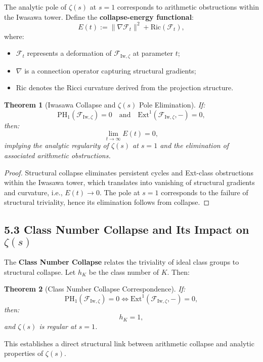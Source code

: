 \documentclass[11pt]{article}
\newtheorem{theorem}{Theorem}[section]
\begin{document}
The analytic pole of $\zeta(s)$ at $s = 1$ corresponds to arithmetic obstructions within the Iwasawa tower. Define the \textbf{collapse-energy functional}:
\[
E(t) := \| \nabla \mathcal{F}_t \|^2 + \mathrm{Ric}(\mathcal{F}_t),
\]
where:
\begin{itemize}
    \item $\mathcal{F}_t$ represents a deformation of $\mathcal{F}_{\mathrm{Iw}, \zeta}$ at parameter $t$;
    \item $\nabla$ is a connection operator capturing structural gradients;
    \item $\mathrm{Ric}$ denotes the Ricci curvature derived from the projection structure.
\end{itemize}

\begin{theorem}[Iwasawa Collapse and $\zeta(s)$ Pole Elimination]
If:
\[
\mathrm{PH}_1(\mathcal{F}_{\mathrm{Iw}, \zeta}) = 0 \quad \text{and} \quad \mathrm{Ext}^1(\mathcal{F}_{\mathrm{Iw}, \zeta}, -) = 0,
\]
then:
\[
\lim_{t \to \infty} E(t) = 0,
\]
implying the analytic regularity of $\zeta(s)$ at $s = 1$ and the elimination of associated arithmetic obstructions.
\end{theorem}

\begin{proof}
Structural collapse eliminates persistent cycles and Ext-class obstructions within the Iwasawa tower, which translates into vanishing of structural gradients and curvature, i.e., $E(t) \to 0$. The pole at $s = 1$ corresponds to the failure of structural triviality, hence its elimination follows from collapse.
\end{proof}

\subsection*{5.3 Class Number Collapse and Its Impact on $\zeta(s)$}

The \textbf{Class Number Collapse} relates the triviality of ideal class groups to structural collapse. Let $h_K$ be the class number of $K$. Then:

\begin{theorem}[Class Number Collapse Correspondence]
If:
\[
\mathrm{PH}_1(\mathcal{F}_{\mathrm{Iw}, \zeta}) = 0 \iff \mathrm{Ext}^1(\mathcal{F}_{\mathrm{Iw}, \zeta}, -) = 0,
\]
then:
\[
h_K = 1,
\]
and $\zeta(s)$ is regular at $s = 1$.
\end{theorem}

This establishes a direct structural link between arithmetic collapse and analytic properties of $\zeta(s)$.
\end{document}
